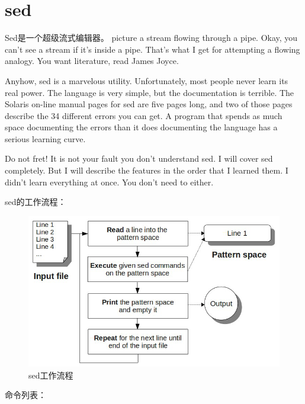 \chapter{sed}
\label{chap:sed}

Sed是一个超级流式编辑器。
picture a stream flowing through a pipe. Okay, you can't see a stream
if it's inside a pipe. That's what I get for attempting a flowing
analogy. You want literature, read James Joyce.

Anyhow, sed is a marvelous utility. Unfortunately, most people never
learn its real power. The language is very simple, but the
documentation is terrible. The Solaris on-line manual pages for sed
are five pages long, and two of those pages describe the 34 different
errors you can get. A program that spends as much space documenting
the errors than it does documenting the language has a serious
learning curve.

Do not fret! It is not your fault you don't understand sed. I will
cover sed completely. But I will describe the features in the order
that I learned them. I didn't learn everything at once. You don't need
to either.

sed的工作流程：
\begin{figure}[!h]
  \centering
  \includegraphics[width=.85\textwidth]{graph/sed_workflow.png}
    \caption{sed工作流程}
  \label{fig:sed_workflow}
\end{figure}

命令列表：

